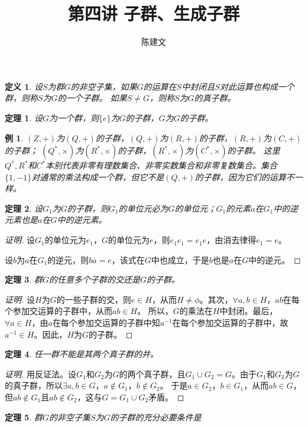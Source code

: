 \documentclass{article}
\newtheorem{Def}{定义}
\newtheorem{Thm}{定理}
\newtheorem*{Example}{例}
\begin{document}
\begin{CJK*}{UTF8}{gbsn}
  \title{第四讲 子群、生成子群}
  \author{陈建文}
  \maketitle
 \begin{Def}
  设$S$为群$G$的非空子集，如果$G$的运算在$S$中封闭且$S$对此运算也构成一个群，则称$S$为$G$的一个子群。
  如果$S\neq G$，则称$S$为$G$的真子群。
 \end{Def} 
\begin{Thm}
设$G$为一个群，则$\{e\}$为$G$的子群，$G$为$G$的子群。
\end{Thm}
\begin{Example}
  $(Z,+)$为$(Q,+)$的子群，$(Q,+)$为$(R,+)$的子群，$(R,+)$为$(C,+)$的子群；
  $(Q^*,\times)$为$(R^*,\times)$的子群，$(R^*,\times)$为$(C^*,\times)$的子群。
  这里$Q^*,R^*$和$C^*$本别代表非零有理数集合、非零实数集合和非零复数集合。集合$\{1,-1\}$对通常的乘法构成一个群，但它不是$(Q,+)$的子群，因为它们的运算不一样。
\end{Example}

 \begin{Thm}
  设$G_1$为$G$的子群，则$G_1$的单位元必为$G$的单位元；$G_1$的元素$a$在$G_1$中的逆元素也是$a$在$G$中的逆元素。
 \end{Thm}
\begin{proof}[证明]
  设$G_1$的单位元为$e_1$，$G$的单位元为$e$，则$e_1e_1=e_1e$，由消去律得$e_1=e$。

  设$b$为$a$在$G_1$的逆元，则$ba=e$，该式在$G$中也成立，于是$b$也是$a$在$G$中的逆元。
\end{proof}
 \begin{Thm}
  群$G$的任意多个子群的交还是$G$的子群。
 \end{Thm}
\begin{proof}[证明]
  设$H$为$G$的一些子群的交，则$e\in H$，从而$H\neq \phi$。其次，$\forall a,b\in H$，$ab$在每个参加交运算的子群中，从而$ab\in H$。
  所以，$G$的乘法在$H$中封闭。最后，$\forall a\in H$，由$a$在每个参加交运算的子群中知$a^{-1}$在每个参加交运算的子群中，故$a^{-1}\in H$。因此，$H$为$G$的子群。
\end{proof}
 \begin{Thm}
  任一群不能是其两个真子群的并。
 \end{Thm}
\begin{proof}[证明]
  用反证法。设$G_1$和$G_2$为$G$的两个真子群，且$G_1\cup G_2=G$。由于$G_1$和$G_2$为$G$的真子群，所以$\exists a,b\in G$，$a\notin G_1$，$b\notin G_2$。
  于是$a\in G_2$，$b\in G_1$，从而$ab\in G$，但$ab\notin G_1$且$ab\notin G_2$，这与$G=G_1\cup G_2$矛盾。
\end{proof}
 \begin{Thm}
  群$G$的非空子集$S$为$G$的子群的充分必要条件是


\end{Thm}
\end{CJK*}
\end{document}
